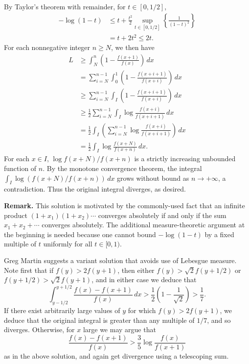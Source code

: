 \documentclass[amssymb,twocolumn,pra,10pt,aps]{revtex4-1}
\begin{document}
\begin{itemize}
By Taylor's theorem with remainder, for $t \in [0,1/2]$,
\begin{align*}
-\log (1-t) &\leq t + \frac{t^2}{2} \sup_{t \in [0,1/2]} \left\{\frac{1}{(1-t)^2}
\right\} \\
&= t + 2 t^2 \leq 2t.
\end{align*}
For each nonnegative integer $n \geq N$, we then have
\begin{align*}
L &\geq \int_N^{n} \left(1 - \frac{f(x+1)}{f(x)} \right)\,dx \\
&= \sum_{i=N}^{n-1} \int_0^1 \left( 1 - \frac{f(x+i+1)}{f(x+i)}\right)\,dx \\
&\geq \sum_{i=N}^{n-1} \int_I \left( 1 - \frac{f(x+i+1)}{f(x+i)}\right)\,dx \\
&\geq \frac{1}{2} \sum_{i=N}^{n-1} \int_I \log \frac{f(x+i)}{f(x+i+1)}\,dx \\
&= \frac{1}{2} \int_I \left( \sum_{i=N}^{n-1} \log \frac{f(x+i)}{f(x+i+1)}\right) \,dx \\
&= \frac{1}{2} \int_I \log \frac{f(x+N)}{f(x+n)} \,dx.
\end{align*}
For each $x \in I$, $\log f(x+N)/f(x+n)$ is a strictly increasing unbounded function of $n$.
By the monotone convergence theorem, the integral $\int_I \log (f(x+N)/f(x+n)) \,dx$ grows without bound
as $n \to +\infty$, a contradiction. Thus the original integral diverges, as desired.

\textbf{Remark.}
This solution is motivated by the commonly-used fact that an infinite product
$(1 + x_1)(1 + x_2) \cdots$ converges absolutely if and only if the sum
$x_1 + x_2 + \cdots$ converges absolutely. The additional measure-theoretic argument at the beginning is needed
because one cannot bound $-\log(1-t)$ by a fixed multiple of $t$ uniformly for all $t \in [0,1)$.

Greg Martin suggests a variant solution that avoids use of Lebesgue measure.
Note first that if $f(y) > 2f(y+1)$, then either $f(y) > \sqrt{2} f(y+1/2)$ or $f(y+1/2) > \sqrt{2} f(y+1)$,
and in either case we deduce that
\[
\int_{y-1/2}^{y+1/2} \frac{f(x)-f(x+1)}{f(x)}\,dx > \frac{1}{2} \left(1 - \frac{1}{\sqrt{2}} \right)  > \frac{1}{7}.
\]
If there exist arbitrarily large values of $y$ for which $f(y) > 2f(y+1)$, we deduce that
the original integral is greater than any multiple of $1/7$, and so diverges. Otherwise,
for $x$ large we may argue that
\[
\frac{f(x)-f(x+1)}{f(x)} > \frac{3}{5} \log \frac{f(x)}{f(x+1)}
\]
as in the above solution, and again get divergence using a telescoping sum.


\end{itemize}
\end{document}
